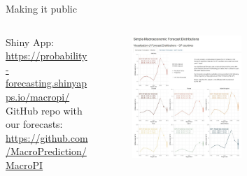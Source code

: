 \documentclass[en]{sdqbeamer}
\begin{document}
\begin{frame}{Making it public}
\begin{columns}
\begin{column}{0.3\textwidth}
Shiny App: \\
   \url{https://probability-forecasting.shinyapps.io/macropi/} \vspace{0.5cm} \\ 
GitHub repo with our forecasts: \\
    \url{https://github.com/MacroPrediction/MacroPI}
    \vspace*{2cm}
\end{column}
\begin{column}{0.7\textwidth}
\vspace*{-10mm}
    \begin{figure}
        \includegraphics[width=0.55\textwidth]{figures/shinycap_newhost.jpg}
        \label{fig:enter-label}
    \end{figure}   
\end{column}
\end{columns}

\end{frame}


\end{document}
